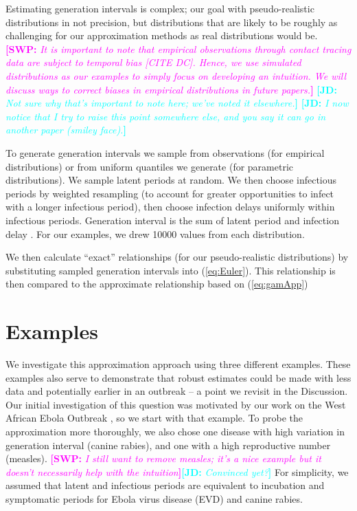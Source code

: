 \documentclass[12pt]{article}
\newcommand{\eref}[1]{(\ref{eq:#1})}
\newcommand{\comment}[3]{\textcolor{#1}{\textbf{[#2: }\textit{#3}\textbf{]}}}
\newcommand{\jd}[1]{\comment{cyan}{JD}{#1}}
\newcommand{\swp}[1]{\comment{magenta}{SWP}{#1}}
\begin{document}
Estimating generation intervals is complex; our goal with pseudo-realistic distributions in not precision, but distributions that are likely to be roughly as challenging for our approximation methods as real distributions would be.
\swp{It is important to note that empirical observations through contact tracing data are subject to temporal bias [CITE DC]. Hence, we use simulated distributions as our examples to simply focus on developing an intuition. We will discuss ways to correct biases in empirical distributions in future papers.}
\jd{Not sure why that's important to note here; we've noted it elsewhere.}
\jd{I now notice that I try to raise this point somewhere else, and you say it can go in another paper (smiley face).}

To generate generation intervals we sample from observations (for empirical distributions) or from uniform quantiles we generate (for parametric distributions). We sample latent periods at random. We then choose infectious periods by weighted resampling (to account for greater opportunities to infect with a longer infectious period), then choose infection delays uniformly within infectious periods. Generation interval is the sum of latent period and infection delay \cite{HampDush09}.  
For our examples, we drew 10000 values from each distribution. 

We then calculate ``exact'' relationships (for our pseudo-realistic distributions) by substituting sampled generation intervals into \eref{Euler}.
This relationship is then compared to the approximate relationship based on \eref{gamApp}

\section{Examples}

We investigate this approximation approach using three different examples. 
These examples also serve to demonstrate that robust estimates could be made with less data and potentially earlier in an outbreak -- a point we revisit in the Discussion.
Our initial investigation of this question was motivated by our work on the West African Ebola Outbreak \cite{WeitDush15}, so we start with that example. To probe the approximation more thoroughly, we also chose one disease with high variation in generation interval (canine rabies), and one with a high reproductive number (measles). \swp{I still want to remove measles; it's a nice example but it doesn't necessarily help with the intuition}\jd{Convinced yet?}
For simplicity, we assumed that latent and infectious periods are equivalent to incubation and symptomatic periods for Ebola virus disease (EVD) and canine rabies.
\end{document}
